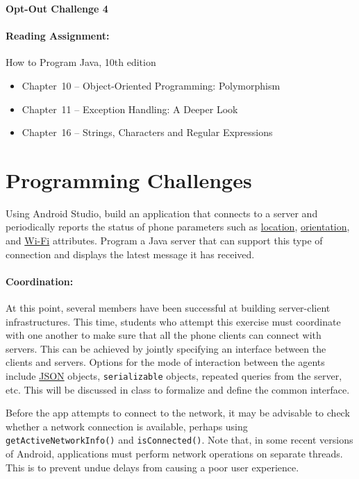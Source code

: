 \documentclass[11pt]{article}
\begin{document}
\begin{center}
{\bfseries \LARGE Opt-Out Challenge 4}
\end{center}

\paragraph{Reading Assignment:}
How to Program Java, 10th edition
\begin{itemize}
\item Chapter~10 -- Object-Oriented Programming: Polymorphism
\item Chapter~11 -- Exception Handling: A Deeper Look
\item Chapter~16 -- Strings, Characters and Regular Expressions
\end{itemize}


\section*{Programming Challenges}

Using Android Studio, build an application that connects to a server and periodically reports the status of phone parameters such as
\href{http://developer.android.com/reference/android/location/LocationManager.html}{location},
\href{http://developer.android.com/reference/android/hardware/SensorManager.html}{orientation},
and \href{http://developer.android.com/reference/android/net/wifi/WifiManager.html}{Wi-Fi} attributes.
Program a Java server that can support this type of connection and displays the latest message it has received.

\paragraph{Coordination:}
At this point, several members have been successful at building server-client infrastructures.
This time, students who attempt this exercise must coordinate with one another to make sure that all the phone clients can connect with servers.
This can be achieved by jointly specifying an interface between the clients and servers.
Options for the mode of interaction between the agents include \href{http://www.json.org/}{JSON} objects, \texttt{serializable} objects, repeated queries from the server, etc.
This will be discussed in class to formalize and define the common interface.

Before the app attempts to connect to the network, it may be advisable to check whether a network connection is available, perhaps using \texttt{getActiveNetworkInfo()} and \texttt{isConnected()}.
Note that, in some recent versions of Android, applications must perform network operations on separate threads.
This is to prevent undue delays from causing a poor user experience.
\end{document}
